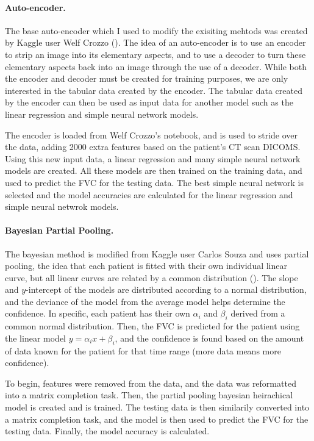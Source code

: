\documentclass[12pt]{article}
\begin{document}
\paragraph*{Auto-encoder.}

The base auto-encoder which I used to modify the exisiting mehtods was created by Kaggle user Welf Crozzo (\cite{image2vec}). 
The idea of an auto-encoder is to use an encoder to strip an image into its elementary aspects, and to use a decoder to turn these elementary aspects back into an image through the use of a decoder.
While both the encoder and decoder must be created for training purposes, we are only interested in the tabular data created by the encoder. 
The tabular data created by the encoder can then be used as input data for another model such as the linear regression and simple neural network models.

The encoder is loaded from Welf Crozzo's notebook, and is used to stride over the data, adding 2000 extra features based on the patient's CT scan DICOMS.
Using this new input data, a linear regression and many simple neural network models are created.
All these models are then trained on the training data, and used to predict the FVC for the testing data.
The best simple neural network is selected and the model accuracies are calculated for the linear regression and simple neural netwrok models.

\paragraph*{Bayesian Partial Pooling.}

The bayesian method is modified from Kaggle user Carlos Souza and uses partial pooling, the idea that each patient is fitted with their own individual linear curve, but all linear curves are related by a common distribution (\cite{bayesian}). 
The slope and $y$-intercept of the models are distributed according to a normal distribution, and the deviance of the model from the average model helps determine the confidence. 
In specific, each patient has their own $\alpha_i$ and $\beta_i$ derived from a common normal distribution. 
Then, the FVC is predicted for the patient using the linear model $y = \alpha_i x + \beta_i$, and the confidence is found based on the amount of data known for the patient for that time range (more data means more confidence).

To begin, features were removed from the data, and the data was reformatted into a matrix completion task.
Then, the partial pooling bayesian heirachical model is created and is trained.
The testing data is then similarily converted into a matrix completion task, and the model is then used to predict the FVC for the testing data.
Finally, the model accuracy is calculated.
\end{document}
